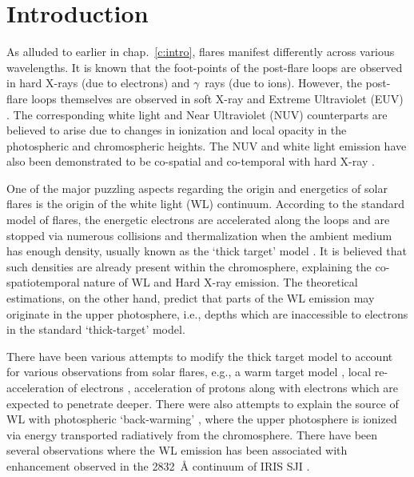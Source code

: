 \section{Introduction} \label{sec:intro}

As alluded to earlier in chap.~\ref{c:intro}, flares manifest differently across various wavelengths. It is known that the foot-points of the post-flare loops are observed in hard X-rays (due to electrons) and $\gamma$~rays (due to ions). However, the post-flare loops themselves are observed in soft X-ray and Extreme Ultraviolet (EUV) \citep{fletcher11,TriBC_2004,tripathi06}. The corresponding white light and Near Ultraviolet (NUV) counterparts are believed to arise due to changes in ionization and local opacity in the photospheric and chromospheric heights. %
The NUV and white light emission have also been demonstrated to be co-spatial and co-temporal with hard X-ray \citep{hudson92, oliverso12}. 

One of the major puzzling aspects regarding the origin and energetics of solar flares is the origin of the white light (WL) continuum. According to the standard model of flares, the energetic electrons are accelerated along the loops and are stopped via numerous collisions and thermalization when the ambient medium has enough density, usually known as the `thick target' model \citep[see][for further details]{brown73,benz17,fletcher11}. It is believed that such densities are already present within the chromosphere, explaining the co-spatiotemporal nature of WL and Hard X-ray emission. The theoretical estimations, on the other hand, predict that parts of the WL emission may originate in the upper photosphere, i.e., depths which are inaccessible to electrons in the standard `thick-target' model. 

There have been various attempts to modify the thick target model to account for various observations from solar flares, e.g., a warm target model \citep{kontar15,kontar19}, local re-acceleration of electrons \citep{brown73}, acceleration of protons along with electrons which are expected to penetrate deeper. There were also attempts to explain the source of WL with photospheric `back-warming' \citep{metclaff90}, where the upper photosphere is ionized via energy transported radiatively from the chromosphere. There have been several observations where the WL emission has been associated with enhancement observed in the 2832~{\AA} continuum of IRIS SJI \citep{heinzel14,kleint16,kleint17,kowalski17,kowalski19}. 

